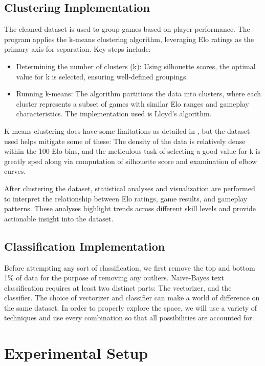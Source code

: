 \documentclass[conference]{IEEEtran}
\begin{document}
\subsection{Clustering Implementation}
 The cleaned dataset is used to group games based on player performance. The program applies the k-means clustering algorithm, leveraging Elo ratings as the primary axis for separation. Key steps include:
\begin{itemize}
    \item Determining the number of clusters (k): Using silhouette scores, the optimal value for k is selected, ensuring well-defined groupings.
    \item Running k-means: The algorithm partitions the data into clusters, where each cluster represents a subset of games with similar Elo ranges and gameplay characteristics. The implementation used is Lloyd's algorithm. \cite{b5}
\end{itemize}

K-means clustering does have some limitations as detailed in \cite{b4}, but the dataset used helps mitigate some of these: The density of the data is relatively dense within the 100-Elo bins, and the meticulous task of selecting a good value for k is greatly sped along via computation of silhouette score and examination of elbow curves.

After clustering the dataset, statistical analyses and visualization are performed to interpret the relationship between Elo ratings, game results, and gameplay patterns. These analyses highlight trends across different skill levels and provide actionable insight into the dataset.
\subsection{Classification Implementation}

Before attempting any sort of classification, we first remove the top and bottom 1\% of data for the purpose of removing any outliers.  Naive-Bayes text classification requires at least two distinct parts: The vectorizer, and the classifier. The choice of vectorizer and classifier can make a world of difference on the same dataset. In order to properly explore the space, we will use a variety of techniques and use every combination so that all possibilities are accounted for.

\section{Experimental Setup}
\end{document}

